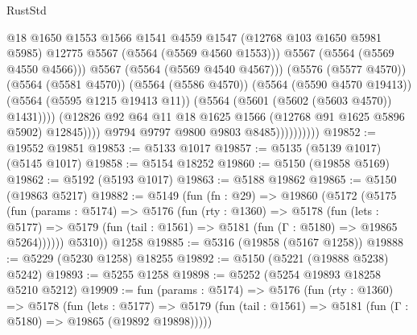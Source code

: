 \begin{lexlean}{RustStd}
\begin{coremodule}
                                        @18
                                        @1650
                                        @1553
                                        @1566
                                        @1541
                                        @4559
                                        @1547
                                        (@12768 @103 @1650 @5981 @5985)
                                        @12775
                                        @5567
                                        (@5564 (@5569 @4560 @1553)))
                                      @5567
                                      (@5564 (@5569 @4550 @4566)))
                                    @5567
                                    (@5564 (@5569 @4540 @4567)))
                                  (@5576 (@5577 @4570))
                                  (@5564 (@5581 @4570))
                                  (@5564 (@5586 @4570))
                                  (@5564 (@5590 @4570 @19413))
                                  (@5564 (@5595 @1215 @19413 @11))
                                  (@5564 (@5601 (@5602 (@5603 @4570)) @1431))))
                              (@12826
                                @92
                                @64
                                @11
                                @18
                                @1625
                                @1566
                                (@12768 @91 @1625 @5896 @5902)
                                @12845))))
                        @9794
                        @9797
                        @9800
                        @9803
                        @8485))))))))))
@19852 := @19552 @19851
@19853 := @5133 @1017
@19857 := @5135 (@5139 @1017) (@5145 @1017)
@19858 := @5154 @18252
@19860 := @5150 (@19858 @5169)
@19862 := @5192 (@5193 @1017)
@19863 := @5188 @19862
@19865 := @5150 (@19863 @5217)
@19882 := @5149
    (fun (fn : @29) =>
    @19860
      (@5172
        (@5175
          (fun (params : @5174) =>
          @5176
            (fun (rty : @1360) =>
            @5178
              (fun (lets : @5177) =>
              @5179 (fun (tail : @1561) => @5181 (fun (Γ : @5180) => @19865 @5264))))))
        @5310))
    @1258
@19885 := @5316 (@19858 (@5167 @1258))
@19888 := @5229 (@5230 @1258) @18255
@19892 := @5150 (@5221 (@19888 @5238) @5242)
@19893 := @5255 @1258
@19898 := @5252 (@5254 @19893 @18258 @5210 @5212)
@19909 := fun (params : @5174) =>
  @5176
    (fun (rty : @1360) =>
    @5178
      (fun (lets : @5177) =>
      @5179 (fun (tail : @1561) => @5181 (fun (Γ : @5180) => @19865 (@19892 @19898)))))

\end{coremodule}
\end{lexlean}
